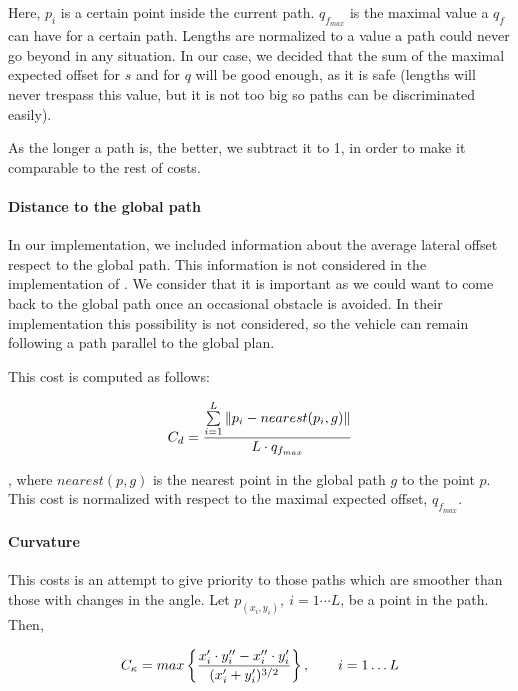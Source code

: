 Here, $p_i$ is a certain point inside the current path. $q_{f_{max}}$ is the maximal value a $q_f$ can have for a certain path. Lengths are normalized to a value a path could never go beyond in any situation. In our case, we decided that the sum of the maximal expected offset for $s$ and for $q$ will be good enough, as it is safe (lengths will never trespass this value, but it is not too big so paths can be discriminated easily).

As the longer a path is, the better, we subtract it to 1, in order to make it comparable to the rest of costs.

\paragraph{Distance to the global path}\label{ch:chapter07_01_04_00_03}

In our implementation, we included information about the average lateral offset respect to the global path. This information is not considered in the implementation of \cite{chu2012local}. We consider that it is important as we could want to come back to the global path once an occasional obstacle is avoided. In their implementation this possibility is not considered, so the vehicle can remain following a path parallel to the global plan.

This cost is computed as follows:

\begin{equation}\label{eq:cp07_lateral_cost}
C_d = {{\sum\limits_{i=1}^{L}\|p_i - nearest(p_i, g)\|} \over {L \cdot q_{f_{max}}}}
\end{equation}

, where $nearest(p, g)$ is the nearest point in the global path $g$ to the point $p$. This cost is normalized with respect to the maximal expected offset, $q_{f_{max}}$.

\paragraph{Curvature}\label{ch:chapter07_01_04_00_04}

This costs is an attempt to give priority to those paths which are smoother than those with changes in the angle. Let $p_(x_i, y_i), ~ i=1\cdots L$, be a point in the path. Then, 

\begin{equation}\label{eq:cp07_curvature_cost}
C_{\kappa} = max \left \{ {{x_i' \cdot y_i'' - x_i'' \cdot y_i'} \over {(x_i' + y_i')^{3/2}}} \right \}, ~~~~~~ i=1 \dots L
\end{equation}

